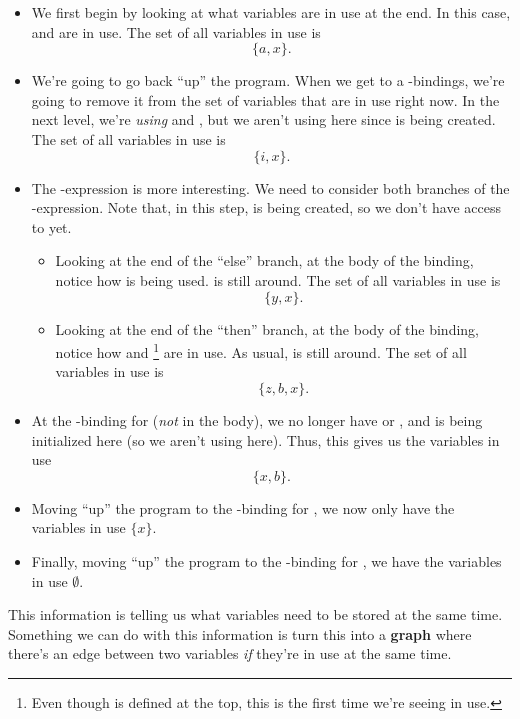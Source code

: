 \documentclass[letterpaper]{article}
\begin{document}
\begin{itemize}
    \item We first begin by looking at what variables are in use at the end. In this case,  and  are in use. The set of all variables in use is \[\{a, x\}.\]
    \item We're going to go back ``up'' the program. When we get to a -bindings, we're going to remove it from the set of variables that are in use right now. In the next level, we're \emph{using}  and , but we aren't using  here since  is being created. The set of all variables in use is \[\{i, x\}.\]
    \item The -expression is more interesting. We need to consider both branches of the -expression. Note that, in this step,  is being created, so we don't have access to  yet.
    \begin{itemize}
        \item Looking at the end of the ``else'' branch, at the body of the  binding, notice how  is being used.  is still around. The set of all variables in use is \[\{y, x\}.\]
        \item Looking at the end of the ``then'' branch, at the body of the  binding, notice how  and \footnote{Even though  is defined at the top, this is the first time we're seeing  in use.} are in use. As usual,  is still around. The set of all variables in use is \[\{z, b, x\}.\]

    \end{itemize}
    \item At the -binding for  (\emph{not} in the body), we no longer have  or , and  is being initialized here (so we aren't using  here). Thus, this gives us the variables in use \[\{x, b\}.\] 
    \item Moving ``up'' the program to the -binding for , we now only have the variables in use $\{x\}$. 
    \item Finally, moving ``up'' the program to the -binding for , we have the variables in use $\emptyset$. 
\end{itemize}
This information is telling us what variables need to be stored at the same time. Something we can do with this information is turn this into a \textbf{graph} where there's an edge between two variables \emph{if} they're in use at the same time. 
\end{document}
